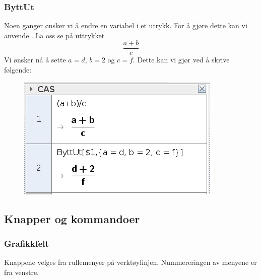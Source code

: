 \subsubsection{ByttUt}
Noen ganger ønsker vi å endre en variabel i et utrykk. For å gjøre dette kan vi anvende . La oss se på uttrykket
\[ \frac{a+b}{c} \]
Vi ønsker nå å sette $ {a=d }$, $ {b=2} $ og $ {c=f} $. Dette kan vi gjør ved å skrive følgende:
\begin{figure}
	\centering
	\includegraphics[scale=0.5]{fig/cas2}
\end{figure}	
\newpage
\subsection{Knapper og kommandoer}
\subsubsection*{Grafikkfelt}
Knappene velges fra rullemenyer på verktøylinjen. Nummereringen av menyene er fra venstre.\vsk

